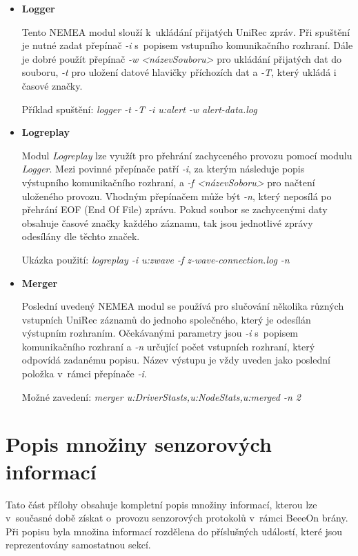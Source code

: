 \documentclass[thesis=M,czech]{FITthesis}[2012/06/26]
\begin{document}
\begin{itemize}
 \item \textbf{Logger}

 Tento NEMEA modul slouží k~ukládání přijatých UniRec zpráv. Při spuštění je nutné zadat 
 přepínač \textit{-i} s~popisem vstupního komunikačního rozhraní. Dále je dobré použít přepínač
 \textit{-w <názevSouboru>} pro ukládání přijatých dat do souboru, \textit{-t} pro uložení datové
 hlavičky příchozích
 dat a \textit{-T}, který ukládá i časové značky.
 
 Příklad spuštění: \textit{logger -t -T -i u:alert -w alert-data.log}
 
 \item \textbf{Logreplay}
 
 Modul \textit{Logreplay} lze využít pro přehrání zachyceného provozu pomocí modulu \textit{Logger}.
 Mezi povinné
 přepínače patří
 \textit{-i}, za kterým následuje popis výstupního komunikačního rozhraní, a \textit{-f <názevSoboru>}
 pro načtení
 uloženého provozu. Vhodným přepínačem může být \textit{-n}, který neposílá po přehrání EOF (End Of File)
 zprávu. Pokud soubor se zachycenými daty obsahuje časové značky každého záznamu, tak jsou 
 jednotlivé zprávy odesílány dle těchto značek.
 
 Ukázka použití: \textit{logreplay -i u:zwave -f z-wave-connection.log -n}
 
 \item \textbf{Merger}
 
 Poslední uvedený NEMEA modul se používá pro slučování několika různých vstupních UniRec
 záznamů do jednoho společného, který je odesílán výstupním rozhraním. Očekávanými parametry jsou
 \textit{-i} s~popisem komunikačního rozhraní a \textit{-n} určující počet vstupních rozhraní,
 který odpovídá
 zadanému popisu. Název výstupu je vždy uveden jako poslední položka v~rámci přepínače \textit{-i}.
 
 Možné zavedení: \textit{merger u:DriverStasts,u:NodeStats,u:merged -n 2}
 

\end{itemize}


\chapter{Popis množiny senzorových informací} \label{sensorData}
Tato část přílohy obsahuje kompletní popis množiny informací, kterou lze v~současné době získat
o~provozu senzorových protokolů v~rámci BeeeOn brány. Při popisu byla množina informací rozdělena
do příslušných událostí, které
jsou reprezentovány samostatnou sekcí.
\end{document}
